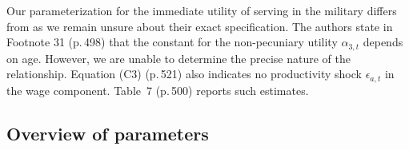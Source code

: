 \begin{Remark} Our parameterization for the immediate utility of serving in the military differs from \citet{Keane.1997} as we remain unsure about their exact specification. The authors state in Footnote 31 (p.\,498) that the constant for the non-pecuniary utility $\alpha_{3,t}$ depends on age. However, we are unable to determine the precise nature of the relationship. Equation (C3) (p.\,521) also indicates no productivity shock $\epsilon_{a,t}$ in the wage component. Table~7 (p.\,500) reports such estimates.
\end{Remark}
\FloatBarrier\subsection{Overview of parameters}
\nopagebreak


